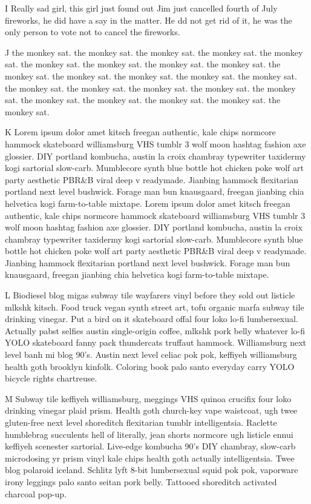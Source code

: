 I Really sad girl, this girl just found out Jim just cancelled fourth of July fireworks, he did have a say in the matter. He dd not get rid of it, he was the only person to vote not to cancel the fireworks.

J the monkey sat. the monkey sat. the monkey sat. the monkey sat. the monkey sat. the monkey sat. the monkey sat. the monkey sat. the monkey sat. the monkey sat. the monkey sat. the monkey sat. the monkey sat. the monkey sat. the monkey sat. the monkey sat. the monkey sat. the monkey sat. the monkey sat. the monkey sat. the monkey sat. the monkey sat. the monkey sat. the monkey sat.

K Lorem ipsum dolor amet kitsch freegan authentic, kale chips normcore hammock skateboard williamsburg VHS tumblr 3 wolf moon hashtag fashion axe glossier. DIY portland kombucha, austin la croix chambray typewriter taxidermy kogi sartorial slow-carb. Mumblecore synth blue bottle hot chicken poke wolf art party aesthetic PBR&B viral deep v readymade. Jianbing hammock flexitarian portland next level bushwick. Forage man bun knausgaard, freegan jianbing chia helvetica kogi farm-to-table mixtape. Lorem ipsum dolor amet kitsch freegan authentic, kale chips normcore hammock skateboard williamsburg VHS tumblr 3 wolf moon hashtag fashion axe glossier. DIY portland kombucha, austin la croix chambray typewriter taxidermy kogi sartorial slow-carb. Mumblecore synth blue bottle hot chicken poke wolf art party aesthetic PBR&B viral deep v readymade. Jianbing hammock flexitarian portland next level bushwick. Forage man bun knausgaard, freegan jianbing chia helvetica kogi farm-to-table mixtape.

L Biodiesel blog migas subway tile wayfarers vinyl before they sold out listicle mlkshk kitsch. Food truck vegan synth street art, tofu organic marfa subway tile drinking vinegar. Put a bird on it skateboard offal four loko lo-fi lumbersexual. Actually pabst selfies austin single-origin coffee, mlkshk pork belly whatever lo-fi YOLO skateboard fanny pack thundercats truffaut hammock. Williamsburg next level banh mi blog 90's. Austin next level celiac pok pok, keffiyeh williamsburg health goth brooklyn kinfolk. Coloring book palo santo everyday carry YOLO bicycle rights chartreuse.

M Subway tile keffiyeh williamsburg, meggings VHS quinoa crucifix four loko drinking vinegar plaid prism. Health goth church-key vape waistcoat, ugh twee gluten-free next level shoreditch flexitarian tumblr intelligentsia. Raclette humblebrag succulents hell of literally, jean shorts normcore ugh listicle ennui keffiyeh scenester sartorial. Live-edge kombucha 90's DIY chambray, slow-carb microdosing yr prism vinyl kale chips health goth actually intelligentsia. Twee blog polaroid iceland. Schlitz lyft 8-bit lumbersexual squid pok pok, vaporware irony leggings palo santo seitan pork belly. Tattooed shoreditch activated charcoal pop-up.

